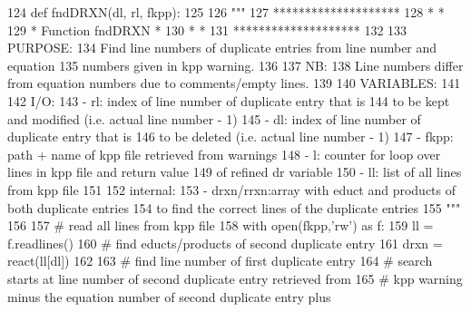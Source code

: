 \begin{DoxyCode}
124 \textcolor{keyword}{def }fndDRXN(dl, rl, fkpp):
125 
126     \textcolor{stringliteral}{"""}
127 \textcolor{stringliteral}{    ********************}
128 \textcolor{stringliteral}{    *                  *}
129 \textcolor{stringliteral}{    * Function fndDRXN *}
130 \textcolor{stringliteral}{    *                  *}
131 \textcolor{stringliteral}{    ********************}
132 \textcolor{stringliteral}{}
133 \textcolor{stringliteral}{    PURPOSE:}
134 \textcolor{stringliteral}{        Find line numbers of duplicate entries from line number and equation}
135 \textcolor{stringliteral}{        numbers given in kpp warning.}
136 \textcolor{stringliteral}{}
137 \textcolor{stringliteral}{    NB:}
138 \textcolor{stringliteral}{        Line numbers differ from equation numbers due to comments/empty lines.}
139 \textcolor{stringliteral}{}
140 \textcolor{stringliteral}{    VARIABLES:}
141 \textcolor{stringliteral}{}
142 \textcolor{stringliteral}{    I/O:}
143 \textcolor{stringliteral}{        - rl:       index of line number of duplicate entry that is}
144 \textcolor{stringliteral}{                    to be kept and modified (i.e. actual line number - 1)}
145 \textcolor{stringliteral}{        - dl:       index of line number of duplicate entry that is}
146 \textcolor{stringliteral}{                    to be deleted (i.e. actual line number - 1)}
147 \textcolor{stringliteral}{        - fkpp:     path + name of kpp file retrieved from warnings}
148 \textcolor{stringliteral}{        - l:        counter for loop over lines in kpp file and return value}
149 \textcolor{stringliteral}{                    of refined dr variable}
150 \textcolor{stringliteral}{        - ll:       list of all lines from kpp file}
151 \textcolor{stringliteral}{}
152 \textcolor{stringliteral}{    internal:}
153 \textcolor{stringliteral}{        - drxn/rrxn:array with educt and products of both duplicate entries}
154 \textcolor{stringliteral}{                    to find the correct lines of the duplicate entries}
155 \textcolor{stringliteral}{    """}
156 
157 \textcolor{comment}{# read all lines from kpp file}
158     with open(fkpp,\textcolor{stringliteral}{'rw'}) \textcolor{keyword}{as} f:
159         ll = f.readlines()
160 \textcolor{comment}{# find educts/products of second duplicate entry}
161         drxn = react(ll[dl])
162 
163 \textcolor{comment}{# find line number of first duplicate entry}
164 \textcolor{comment}{# search starts at line number of second duplicate entry retrieved from}
165 \textcolor{comment}{# kpp warning minus the equation number of second duplicate entry plus}

\end{DoxyCode}
